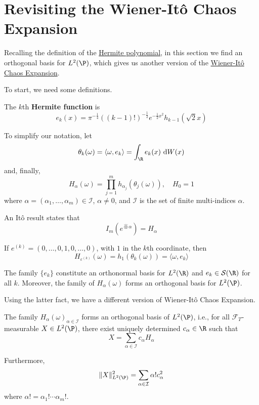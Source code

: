 \section{Revisiting the Wiener-Itô Chaos Expansion}

Recalling the definition of the \hyperref[hermite-polynomials]{Hermite polynomial}, in this section we find an orthogonal basis for $L^2(\P)$, which gives us another version of the \hyperref[thm:chaos-expansion]{Wiener-Itô Chaos Expansion}.

To start, we need some definitions.

\begin{definition}
The $k$th \textbf{Hermite function} is 
\[
e_k(x) = \pi^{-\frac{1}{4}}((k-1)!)^{-\frac{1}{2}} e^{-\frac{1}{2} x^2} h_{k-1}(\sqrt{2} x)
\]

To simplify our notation, let
\[
\theta_k(\omega) = \langle \omega, e_k \rangle = \int_\R e_k(x) ~\mathrm{d}W(x)
\]
and, finally,
\[
H_\alpha(\omega) = \prod_{j=1}^m h_{\alpha_j} (\theta_j(\omega)), \quad H_0 = 1
\]
where $\alpha = (\alpha_1, \ldots, \alpha_m) \in \mathcal{I}$, $\alpha \neq 0$, and $\mathcal{I}$ is the set of finite multi-indices $\alpha$.
\end{definition}

An Itô result states that
\begin{equation}\label{eq:202405131753}
I_m(e^{\hat{\otimes} \alpha}) = H_\alpha
\end{equation}

\begin{example}
If $e^{(k)} = (0, \ldots, 0, 1, 0, \ldots, 0)$, with $1$ in the $k$th coordinate, then
\[
H_{\varepsilon^{(k)}}(\omega) = h_1(\theta_k(\omega)) = \langle \omega, e_k \rangle
\]
\end{example}

\begin{remark}
The family $\{ e_k \}$ constitute an orthonormal basis for $L^2(\R)$ and $e_k \in \mathcal{S}(\R)$ for all $k$. Moreover, the family of $H_\alpha(\omega)$ forms an orthogonal basis for $L^2(\P)$.
\end{remark}

Using the latter fact, we have a different version of Wiener-Itô Chaos Expansion.

\begin{theorem}\label{thm:chaos-exp-2}
The family ${H_\alpha(\omega)}_{\alpha \in \mathcal{I}}$ forms an orthogonal basis of $L^2(\P)$, i.e., for all $\mathcal{F}_T$-measurable $X \in L^2(\P)$, there exist uniquely determined $c_\alpha \in \R$ such that 
\[
X = \sum_{\alpha \in \mathcal{I}} c_\alpha H_\alpha
\]

Furthermore, 
\[
	\| X \|_{L^2(\P)}^2 = \sum_{\alpha \in \mathcal{I}} \alpha! c_\alpha^2
\]
where $\alpha! = \alpha_1! \cdots \alpha_m!$.
\end{theorem}

